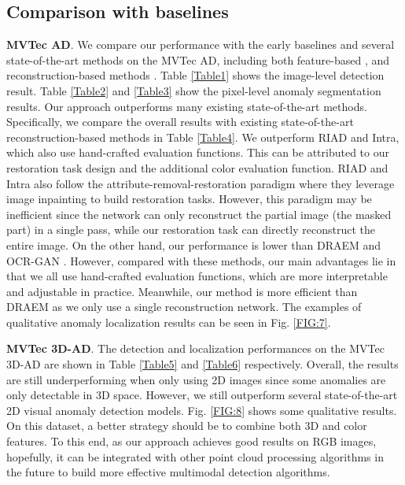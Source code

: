 \documentclass[5p, twocolumn]{elsarticle}[draft]
\begin{document}
\subsection{Comparison with baselines}
\textbf{MVTec AD}. We compare our performance with the early baselines \cite{bergmann2018improving} and several state-of-the-art methods on the MVTec AD, including both feature-based \cite{yi2020patch, schluter2021self,rudolph2021same,shi2021unsupervised,li2021cutpaste,bergmann2020uninformed,defard2021padim}, and reconstruction-based methods \cite{huang2019inverse,zavrtanik2021reconstruction,pirnay2022inpainting}. Table \ref{Table1} shows the image-level detection result. Table \ref{Table2} and \ref{Table3} show the pixel-level anomaly segmentation results. Our approach outperforms many existing state-of-the-art methods. Specifically, we compare the overall results with existing state-of-the-art reconstruction-based methods in Table \ref{Table4}. We outperform RIAD and Intra, which also use hand-crafted evaluation functions. This can be attributed to our restoration task design and the additional color evaluation function. RIAD and Intra also follow the attribute-removal-restoration paradigm where they leverage image inpainting to build restoration tasks. However, this paradigm may be inefficient since the network can only reconstruct the partial image (the masked part) in a single pass, while our restoration task can directly reconstruct the entire image. On the other hand, our performance is lower than DRAEM \cite{zavrtanik2021draem} and OCR-GAN \cite{liang2022omni}. However, compared with these methods, our main advantages lie in that we all use hand-crafted evaluation functions, which are more interpretable and adjustable in practice. Meanwhile, our method is more efficient than DRAEM as we only use a single reconstruction network. The examples of qualitative anomaly localization results can be seen in Fig. \ref{FIG:7}.

\textbf{MVTec 3D-AD}. The detection and localization performances on the MVTec 3D-AD \cite{bergmann2021mvtec} are shown in Table \ref{Table5} and \ref{Table6} respectively. Overall, the results are still underperforming when only using 2D images since some anomalies are only detectable in 3D space.  However, we still outperform several state-of-the-art 2D visual anomaly detection models.  Fig. \ref{FIG:8} shows some qualitative results. On this dataset, a better strategy should be to combine both 3D and color features. To this end, as our approach achieves good results on RGB images, hopefully, it can be integrated with other point cloud processing algorithms in the future to build more effective multimodal detection algorithms.
\end{document}
